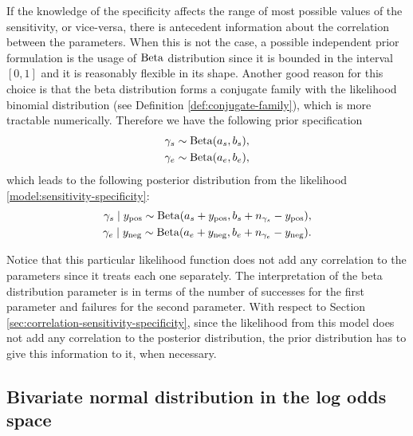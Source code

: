 If the knowledge of the specificity affects the range of most possible values
of the sensitivity, or vice-versa, there is antecedent information about the
correlation between the parameters. When this is not the case, a possible
independent prior formulation is the usage of $\operatorname{Beta}$ distribution since
it is bounded in the interval $[0,1]$ and it is reasonably flexible in its
shape.  Another good reason for this choice is that the beta distribution
forms a conjugate family with the likelihood binomial distribution (see Definition
\ref{def:conjugate-family}), which is more tractable numerically. Therefore we
have the following prior specification
\begin{equation*}
  \begin{aligned}
    \gamma_s & \sim \operatorname{Beta}(a_s, b_s), \\
    \gamma_e & \sim \operatorname{Beta}(a_e, b_e),
  \end{aligned}
\end{equation*}
which leads to the following posterior distribution from the likelihood
\eqref{model:sensitivity-specificity}:
\begin{equation*}
  \begin{aligned}
    \gamma_s \mid y_{\mathrm{pos}} \sim \operatorname{Beta}(a_s + y_{\mathrm{pos}}, b_s + n_{\gamma_s} - y_{\mathrm{pos}}), \\
    \gamma_e \mid y_{\mathrm{neg}} \sim \operatorname{Beta}(a_e + y_{\mathrm{neg}}, b_e + n_{\gamma_e} - y_{\mathrm{neg}}).
  \end{aligned}
\end{equation*}

Notice that this particular likelihood function does not add any correlation to the
parameters since it treats each one separately. The interpretation of the beta
distribution parameter is in terms of the number of successes for the first
parameter and failures for the second parameter. With respect to Section
\ref{sec:correlation-sensitivity-specificity}, since the likelihood from this
model does not add any correlation to the posterior distribution, the prior
distribution has to give this information to it, when necessary.

\subsection{Bivariate normal distribution in the log odds space}

